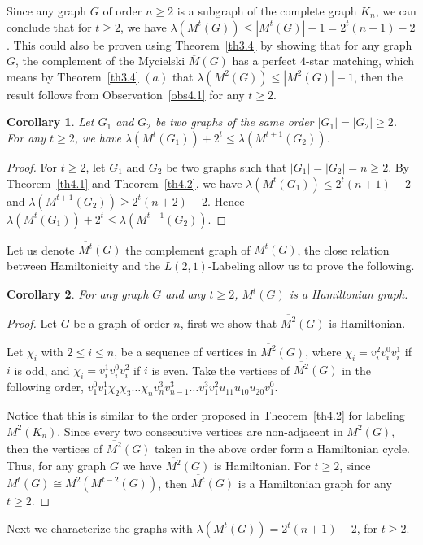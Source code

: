 \documentclass{article}
\newtheorem{cor} {Corollary}
\newtheorem{open problem} {Open Problem}
\numberwithin{lemma}{section}
\numberwithin{theorem}{section}
\numberwithin{cor}{section}
\numberwithin{prop}{section}
\numberwithin{con}{section}
\numberwithin{claim}{section}
\numberwithin{obs}{section}
\numberwithin{dnt}{section}
\begin{document}
Since any graph $G$ of order $n\geq 2$ is a subgraph of the complete graph $K_n$, we can conclude that for $t\geq 2$, we have $\lambda(M^t(G))\leq |M^t(G)|-1=2^t(n+1)-2$. This could also be proven using Theorem~\ref{th3.4} by showing that for any graph $G$, the complement of the Mycielski $\overline{M}(G)$ has a perfect $4$-star matching, which means by Theorem~\ref{th3.4} $(a)$ that $\lambda(M^2(G))\leq |M^2(G)|-1$, then the result follows from Observation~\ref{obs4.1} for any $t\geq 2$.
\begin{cor}
	Let $G_1$ and $G_2$ be two graphs of the same order $|G_1|=|G_2|\geq 2$. For any $t\geq 2$, we have $\lambda(M^t(G_1))+2^t\leq \lambda(M^{t+1}(G_2))$. 	
\end{cor}
\begin{proof}
	For $t\geq 2$, let $G_1$ and $G_2$ be two graphs such that $|G_1|=|G_2|=n\geq 2$. By Theorem~\ref{th4.1} and Theorem~\ref{th4.2}, we have  $\lambda(M^t(G_1))\leq 2^t(n+1)-2$ and   $\lambda(M^{t+1}(G_2))\geq 2^t(n+2)-2$. Hence $\lambda(M^t(G_1))+2^t\leq \lambda(M^{t+1}(G_2)) $. 
\end{proof}
Let us denote $\overline{M^t}(G)$ the complement graph of $M^t(G)$, the close relation between Hamiltonicity and the $L(2,1)$-Labeling allow us to prove the following.
\begin{cor}
	For any graph $G$ and any $t\geq 2$, $\overline{M^t}(G)$ is a Hamiltonian graph.
\end{cor}
\begin{proof}
	Let $G$ be a graph of order $n$, first we show that $\overline{M^2}(G)$ is Hamiltonian.\par
	Let $\chi_i$ with $2\leq i\leq n$, be a sequence of vertices in $\overline{M^2}(G)$, where $\chi_i=v^2_iv^0_iv^1_i$ if $i$ is odd, and $\chi_i=v^1_iv^0_iv^2_i$ if $i$ is even. Take the vertices of $\overline{M^2}(G)$ in the following  order, $v^0_1v^1_1\chi_2\chi_3\ldots \chi_nv^3_nv^3_{n-1}\ldots v^3_1v^2_1u_{11}u_{10}u_{20}v^0_1$.
	\par Notice that this is similar to the  order proposed in Theorem~\ref{th4.2} for labeling $M^2(K_n)$. Since every two consecutive vertices are non-adjacent in $M^2(G)$, then the vertices of $\overline{M^2}(G)$ taken in the above order form a Hamiltonian cycle. Thus, for any graph $G$ we have $\overline{M^2}(G)$ is Hamiltonian. For $t\geq 2$, since $M^t(G)\cong M^2(M^{t-2}(G))$, then $\overline{M^t}(G)$ is a Hamiltonian graph for any $t\geq 2$.
\end{proof}
Next we characterize the graphs with $\lambda(M^t(G))=2^t(n+1)-2$, for $t\geq 2$.
\end{document}

